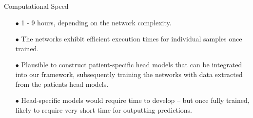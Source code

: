 \documentclass[aspectratio=169, 9pt]{beamer}
\begin{document}
\begin{frame}{Computational Speed}
    \begin{itemize}
      \item[$\bullet$] 1 - 9 hours, depending on the network complexity.
      \item[$\bullet$] The networks exhibit efficient execution times for individual samples once trained.
      \item[$\bullet$] Plausible to construct patient-specific head models that can be integrated into our framework, subsequently training the networks with data extracted from the patients head models.
      \item[$\bullet$] Head-specific models would require time to develop -- but once fully trained, likely to require very short time for outputting predictions.
    \end{itemize}
\end{frame}


\end{document}
